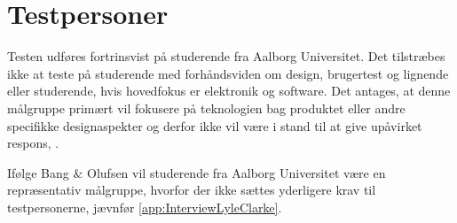 \section{Testpersoner}
\label{TestpersonerValgAfGestikker}
%
Testen udføres fortrinsvist på studerende fra Aalborg Universitet. Det tilstræbes ikke at teste på studerende med forhåndsviden om design, brugertest og lignende eller studerende, hvis hovedfokus er elektronik og software. Det antages, at denne målgruppe primært vil fokusere på teknologien bag produktet eller andre specifikke designaspekter og derfor ikke vil være i stand til at give upåvirket respons, \parencite[s. 110]{Book:OUE}. 

Ifølge Bang $\&$ Olufsen vil studerende fra Aalborg Universitet være en repræsentativ målgruppe, hvorfor der ikke sættes yderligere krav til testpersonerne, jævnfør \autoref{app:InterviewLyleClarke}.  
%
